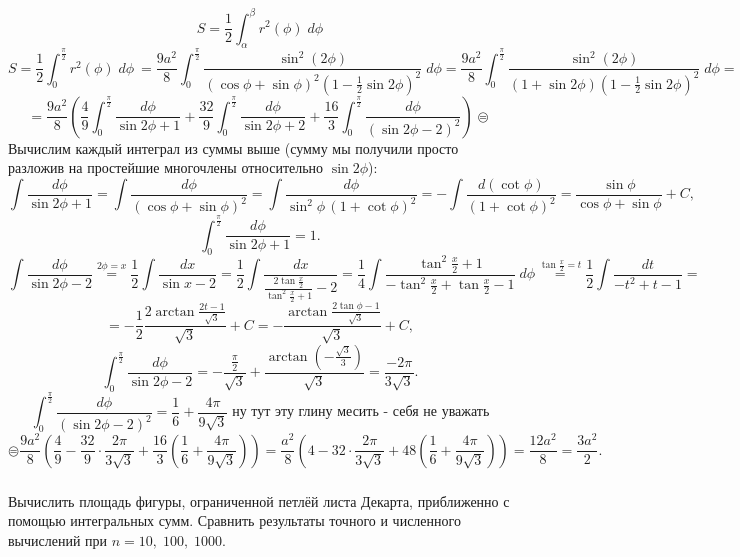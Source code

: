 \[S = \frac{1}{2}\int_{\alpha}^{\beta}r^2(\phi) \; d\phi\]
\[S = \frac{1}{2}\int_{0}^{\frac{\pi}{2}}r^2(\phi) \; d\phi\ = \frac{9a^2}{8}\int_{0}^{\frac{\pi}{2}}\frac{\sin^2(2\phi)}{(\cos\phi + \sin\phi)^2(1-\frac{1}{2}\sin{2\phi})^2} \; d\phi = \frac{9a^2}{8}\int_{0}^{\frac{\pi}{2}}\frac{\sin^2(2\phi)}{(1 + \sin{2\phi})(1-\frac{1}{2}\sin{2\phi})^2} \; d\phi = \]
\[
= \frac{9a^2}{8} \left( \frac{4}{9} \int_{0}^{\frac{\pi}{2}} \frac{d\phi}{\sin{2\phi} + 1} + \frac{32}{9} \int_{0}^{\frac{\pi}{2}} \frac{d\phi}{\sin{2\phi} + 2} + \frac{16}{3} \int_{0}^{\frac{\pi}{2}} \frac{d\phi}{(\sin{2\phi} - 2)^2} \right) \circledequal
\]
\noindent Вычислим каждый интеграл из суммы выше (сумму мы получили просто разложив на простейшие многочлены относительно $\sin{2\phi}$): \\
\[\int\frac{d\phi}{\sin{2\phi} + 1} = \int\frac{d\phi}{(\cos\phi + \sin\phi)^2} = \int\frac{d\phi}{\sin^2\phi\,(1+\cot\phi)^2} = -\int\frac{d(\cot{\phi})}{(1+\cot\phi)^2} = \frac{\sin\phi}{\cos\phi + \sin\phi} + C,\]
\[\int_0^{\frac{\pi}{2}}\frac{d\phi}{\sin{2\phi} + 1} = 1.\]
\[\int \frac{d\phi}{\sin{2\phi}-2} \stackrel{2\phi=x}{=} \frac{1}{2}\int\frac{dx}{\sin{x}-2} = \frac{1}{2}
\int\frac{dx}{\frac{2\tan{\frac{x}{2}}}{\tan^2{\frac{x}{2}} + 1} - 2} = \frac{1}{4}\int\frac{\tan^2{\frac{x}{2} + 1}}{-\tan^2{\frac{x}{2}} + \tan{\frac{x}{2}} - 1} \; d\phi \stackrel{\tan{\frac{x}{2}} = t}{=} \frac{1}{2}\int \frac{dt}{-t^2+t-1} = \] 
\[= -\frac{1}{2}\frac{2\arctan{\frac{2t-1}{\sqrt{3}}}}{\sqrt{3}} + C = -\frac{\arctan{\frac{2\tan{\phi}-1}{\sqrt{3}}}}{\sqrt{3}} + C,\]
\[\int_0^{\frac{\pi}{2}} \frac{d\phi}{\sin2\phi-2} = -\frac{\frac{\pi}{2}}{\sqrt3} + \frac{\arctan\left({-\frac{\sqrt{3}}{3}}\right)}{\sqrt{3}} = \frac{-2\pi}{3\sqrt3}.\]
\[\int_0^{\frac{\pi}{2}} \frac{d\phi}{(\sin{2\phi} - 2)^2} = \frac{1}{6} + \frac{4\pi}{9\sqrt3} \; \text{ну тут эту глину месить - себя не уважать}\]
\[\circledequal \frac{9a^2}{8}\left(\frac{4}{9} - \frac{32}{9}\cdot \frac{2\pi}{3\sqrt{3}} + \frac{16}{3} \left(\frac{1}{6} + \frac{4\pi}{9\sqrt{3}} \right) \right) = \frac{a^2}{8}\left(4- 32\cdot \frac{2\pi}{3\sqrt{3}} + 48 \left(\frac{1}{6} + \frac{4\pi}{9\sqrt{3}} \right) \right) = \frac{12a^2}{8} = \frac{3a^2}{2}.\]
\subsubsection{}
Вычислить площадь фигуры, ограниченной петлёй листа Декарта, приближенно с помощью интегральных сумм. Сравнить результаты точного и численного вычислений при $n = 10, \; 100, \; 1000$. \\

